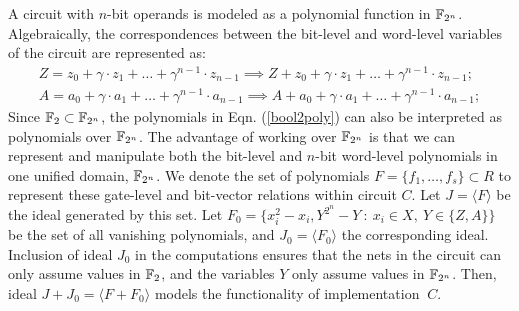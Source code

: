 A circuit with $n$-bit operands is modeled as a polynomial function in ${\mathbb{F}}_{2^n}$.
Algebraically, the correspondences between the bit-level and word-level
variables of the circuit are represented as:
\begin{equation}
\label{ip-word-level}
\begin{split}
Z =  z_0 +\gamma \cdot  z_1 + \dots +\gamma^{n-1} \cdot z_{n-1} \implies Z + z_0 +\gamma \cdot  z_1 + \dots +\gamma^{n-1} \cdot z_{n-1};\\
A =  a_0 +\gamma \cdot a_1 + \dots +\gamma^{n-1} \cdot a_{n-1} \implies A + a_0 +\gamma \cdot a_1 + \dots +\gamma^{n-1} \cdot a_{n-1};
\end{split}
\end{equation}
Since ${\mathbb{F}}_2 \subset {\mathbb{F}}_{2^n}$, the polynomials in 
Eqn. (\ref{bool2poly}) can also be interpreted as polynomials over ${\mathbb{F}}_{2^n}$. 
The advantage of working over ${\mathbb{F}}_{2^n}$ is that we can represent and manipulate 
both the bit-level and $n$-bit word-level polynomials in one unified domain, ${\mathbb{F}}_{2^n}$.
We denote the set of polynomials $F=\{f_1,\dots,f_s\} \subset R$ to represent these
gate-level and bit-vector relations within circuit $C$. Let $J =\langle F\rangle$ be the
ideal generated by this set.
Let $F_0 = \{x_i^2-x_i, Y^{2^n}-Y~:~x_i \in X,
~Y \in \{Z,A\}\}$ be the set of all vanishing
polynomials, and $J_0 = \langle F_0\rangle$ the corresponding ideal.
Inclusion of ideal $J_0$ in the computations ensures that the nets in the circuit can
only assume values in ${\mathbb{F}}_2$, and the variables $Y$ only assume values in ${\mathbb{F}}_{2^n}$.
Then, ideal $J+J_0 = \langle F + F_0\rangle$ models the functionality of
implementation $~C$. 

